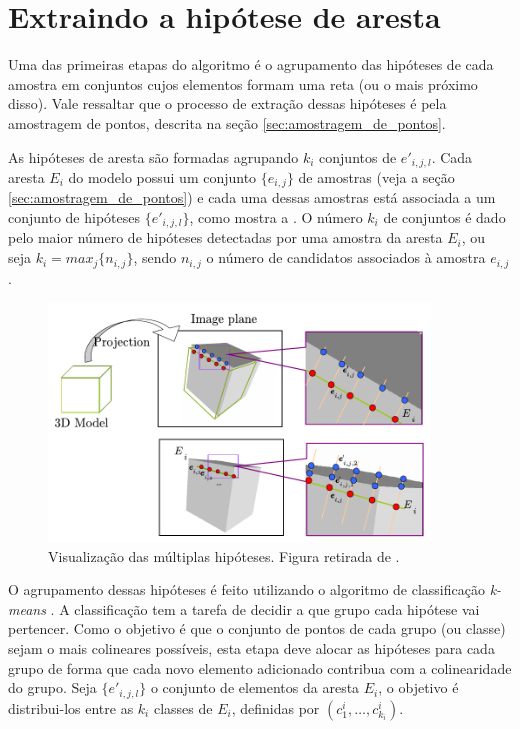 \section{Extraindo a hipótese de aresta}

Uma das primeiras etapas do algoritmo é o agrupamento das hipóteses de cada amostra em conjuntos cujos elementos formam uma reta (ou o mais próximo disso). Vale ressaltar que o processo de extração dessas hipóteses é pela amostragem de pontos, descrita na seção \ref{sec:amostragem_de_pontos}.

As hipóteses de aresta são formadas agrupando $k_i$ conjuntos de $e'_{i,j,l}$. Cada aresta $E_i$ do modelo possui um conjunto $\{e_{i,j}\}$ de amostras (veja a seção \ref{sec:amostragem_de_pontos}) e cada uma dessas amostras está associada a um conjunto de hipóteses $\{e'_{i,j,l}\}$, como mostra a . O número $k_i$ de conjuntos é dado pelo maior número de hipóteses detectadas por uma amostra da aresta $E_i$, ou seja $k_i = max_j\{n_{i,j}\}$, sendo $n_{i,j}$ o número de candidatos associados à amostra $e_{i,j}$.

\begin{figure}[!ht]
\centering\includegraphics[width=0.9\textwidth]{monografia/multiplas_hipoteses_celine}
\caption{Visualização das múltiplas hipóteses. Figura retirada de \cite{celine}.}
\label{multiplas_hipoteses_celine}
\end{figure}

O agrupamento dessas hipóteses é feito utilizando o algoritmo de classificação \emph{k-means} \cite{kmeans}. A classificação tem a tarefa de decidir a que grupo cada hipótese vai pertencer. Como o objetivo é que o conjunto de pontos de cada grupo (ou classe) sejam o mais colineares possíveis, esta etapa deve alocar as hipóteses para cada grupo de forma que cada novo elemento adicionado contribua com a colinearidade do grupo. Seja $\{e'_{i,j,l}\}$ o conjunto de elementos da aresta $E_i$, o objetivo é distribui-los entre as $k_i$ classes de $E_i$, definidas por $(c^i_1, \dots, c^i_{k_i})$.

